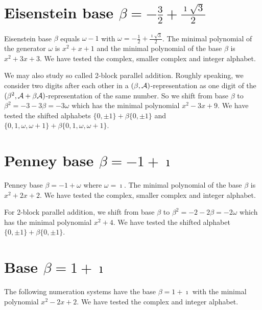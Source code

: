 \section{\texorpdfstring{Eisenstein base $\beta = -\frac{3}{2} + \frac{\imath \sqrt{3}}{2}$}{Eisenstein base beta = -3/2 + i sqrt(3)/2}}
Eisenstein base $\beta$ equals $\omega - 1$ with $\omega =-\frac{1}{2} + \frac{\imath \sqrt{3}}{2}$. The minimal polynomial of the generator $\omega$ is $x^2 + x+1$ and the minimal polynomial of the base $\beta$ is $x^2 + 3x+3$. We have tested the complex, smaller complex and integer alphabet.
 




We may also study so called 2-block parallel addition. Roughly speaking, we consider two digits after each other in a $(\beta,\mathcal{A})$-representation as one digit of the $(\beta^2,\mathcal{A}+\beta\mathcal{A})$-representation of the same number. So we shift from base $\beta$ to $\beta^2=-3-3\beta=-3\omega$ which has the minimal polynomial $x^2-3x+9$. We have tested the shifted alphabets $\{0,\pm 1\}+\beta \{0,\pm 1\}$ and $\{0,1, \omega, \omega +1\}+\beta \{0,1, \omega, \omega +1\}$.
  



\section{\texorpdfstring{Penney base $\beta = -1 + \imath$}{Penney base beta = -1 + i}}
Penney base $\beta = -1 + \omega$ where $\omega=\imath$. The minimal polynomial of the base $\beta$ is $x^2 + 2x+2$. We have tested the complex, smaller complex and integer alphabet.




For 2-block parallel addition, we shift from base $\beta$ to $\beta^2=-2-2\beta=-2\omega$ which has the minimal polynomial $x^{2} + 4$. We have tested the shifted alphabet $\{0,\pm 1\}+\beta \{0,\pm 1\}$.



\section{\texorpdfstring{Base $\beta = 1 + \imath$}{Base beta = 1 + i}}
The following numeration systems have the base $\beta =1 + \imath$ with the minimal polynomial $x^2-2x+2$. We have tested the complex and integer alphabet.

